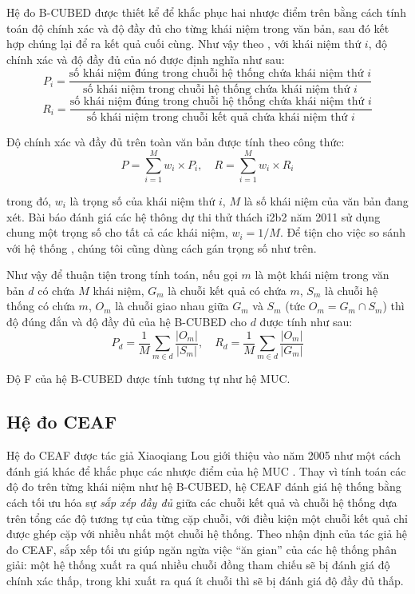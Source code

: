 Hệ đo B-CUBED được thiết kể để khắc phục hai nhược điểm trên bằng cách tính toán độ chính xác và độ đầy đủ cho từng khái niệm trong văn bản, sau đó kết hợp chúng lại để ra kết quả cuối cùng. Như vậy theo \cite{AmitBagga1998}, với khái niệm thứ $i$, độ chính xác và độ đầy đủ của nó được định nghĩa như sau:
\[P_i=\frac{\text{số khái niệm đúng trong chuỗi hệ thống chứa khái niệm thứ $i$}}{\text{số khái niệm trong chuỗi hệ thống chứa khái niệm thứ $i$}}\]
\[R_i=\frac{\text{số khái niệm đúng trong chuỗi hệ thống chứa khái niệm thứ $i$}}{\text{số khái niệm trong chuỗi kết quả chứa khái niệm thứ $i$}}\]

Độ chính xác và đầy đủ trên toàn văn bản được tính theo công thức:
\[P=\sum_{i=1}^{M} w_i \times P_i,\quad R=\sum_{i=1}^{M} w_i\times R_i\]

\noindent trong đó, $w_i$ là trọng số của khái niệm thứ $i$, $M$ là số khái niệm của văn bản đang xét. Bài báo đánh giá các hệ thông dự thi thử thách i2b2 năm 2011 sử dụng chung một trọng số cho tất cả các khái niệm, $w_i=1/M$. Để tiện cho việc so sánh với hệ thống \cite{YanXu2012}, chúng tôi cũng dùng cách gán trọng số như trên.

Như vậy để thuận tiện trong tính toán, nếu gọi $m$ là một khái niệm trong văn bản $d$ có chứa $M$ khái niệm, $G_m$ là chuỗi kết quả có chứa $m$, $S_m$ là chuỗi hệ thống có chứa $m$, $O_m$ là chuỗi giao nhau giữa $G_m$ và $S_m$ (tức $O_m=G_m\cap S_m$) thì độ đúng đắn và độ đầy đủ của hệ B-CUBED cho $d$ được tính như sau:
\[P_d=\frac{1}{M}\sum_{m\in d}\frac{|O_m|}{|S_m|},\quad R_d=\frac{1}{M}\sum_{m\in d}\frac{|O_m|}{|G_m|}\]

Độ F của hệ B-CUBED được tính tương tự như hệ MUC.

\subsection*{Hệ đo CEAF}
Hệ đo CEAF được tác giả Xiaoqiang Lou giới thiệu vào năm 2005 như một cách đánh giá khác để khắc phục các nhược điểm của hệ MUC \cite{XiaoquangLuo2005}. Thay vì tính toán các độ đo trên từng khái niệm như hệ B-CUBED, hệ CEAF đánh giá hệ thống bằng cách tối ưu hóa sự \emph{sắp xếp đầy đủ} giữa các chuỗi kết quả và chuỗi hệ thống dựa trên tổng các độ tương tự của từng cặp chuỗi, với điều kiện một chuỗi kết quả chỉ được ghép cặp với nhiều nhất một chuỗi hệ thống. Theo nhận định của tác giả hệ đo CEAF, sắp xếp tối ưu giúp ngăn ngừa việc ``ăn gian'' của các hệ thống phân giải: một hệ thống xuất ra quá nhiều chuỗi đồng tham chiếu sẽ bị đánh giá độ chính xác thấp, trong khi xuất ra quá ít chuỗi thì sẽ bị đánh giá độ đầy đủ thấp.

